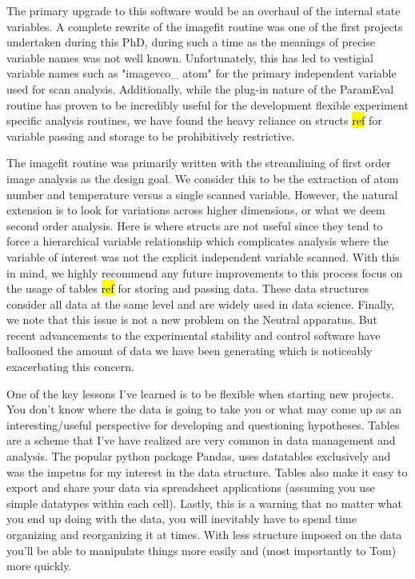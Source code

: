 The primary upgrade to this software would be an overhaul of the internal state variables.
A complete rewrite of the imagefit routine was one of the first projects undertaken during this PhD, during such a time as the meanings of precise variable names was not well known.
Unfortunately, this has led to vestigial variable names such as "imagevco\_ atom" for the primary independent variable used for scan analysis.
Additionally, while the plug-in nature of the ParamEval routine has proven to be incredibly useful for the development flexible experiment specific analysis routines, we have found the heavy reliance on structs \hl{ref} for variable passing and storage to be prohibitively restrictive.

The imagefit routine was primarily written with the streamlining of first order image analysis as the design goal.
We consider this to be the extraction of atom number and temperature versus a single scanned variable.
However, the natural extension is to look for variations across higher dimensions, or what we deem second order analysis.
Here is where structs are not useful since they tend to force a hierarchical variable relationship which complicates analysis where the variable of interest was not the explicit independent variable scanned.
With this in mind, we highly recommend any future improvements to this process focus on the usage of tables \hl{ref} for storing and passing data.
These data structures consider all data at the same level and are widely used in data science.
Finally, we note that this issue is not a new problem on the Neutral apparatus. 
But recent advancements to the experimental stability and control software have ballooned the amount of data we have been generating which is noticeably exacerbating this concern.

One of the key lessons I've learned is to be flexible when starting new projects. 
You don't know where the data is going to take you or what may come up as an interesting/useful perspective for developing and questioning hypotheses. 
Tables are a scheme that I've have realized are very common in data management and analysis. 
The popular python package Pandas, uses datatables exclusively and was the impetus for my interest in the data structure. 
Tables also make it easy to export and share your data via spreadsheet applications (assuming you use simple datatypes within each cell).
Lastly, this is a warning that no matter what you end up doing with the data, you will inevitably have to spend time organizing and reorganizing it at times. 
With less structure imposed on the data you'll be able to manipulate things more easily and (most importantly to Tom) more quickly.